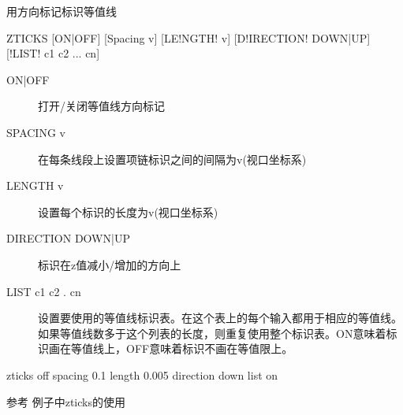 \label{cmd:zticks}

用方向标记标识等值线

\begin{SACSTX}
ZTICKS [ON|OFF] [Spacing v] [LE!NGTH! v] [D!IRECTION! DOWN|UP]
    [!LIST! c1 c2 ... cn]
\end{SACSTX}

\begin{description}
\item [ON|OFF] 打开/关闭等值线方向标记
\item [SPACING v] 在每条线段上设置项链标识之间的间隔为v(视口坐标系)
\item [LENGTH v] 设置每个标识的长度为v(视口坐标系)
\item [DIRECTION DOWN|UP] 标识在z值减小/增加的方向上
\item [LIST c1 c2 . cn] 设置要使用的等值线标识表。在这个表上的每个输入都用于相应的等值线。如果等值线数多于这个列表的长度，则重复使用整个标识表。ON意味着标识画在等值线上，OFF意味着标识不画在等值限上。
\end{description}

\begin{SACDFT}
zticks off spacing 0.1 length 0.005 direction down list on
\end{SACDFT}

参考  例子中zticks的使用

